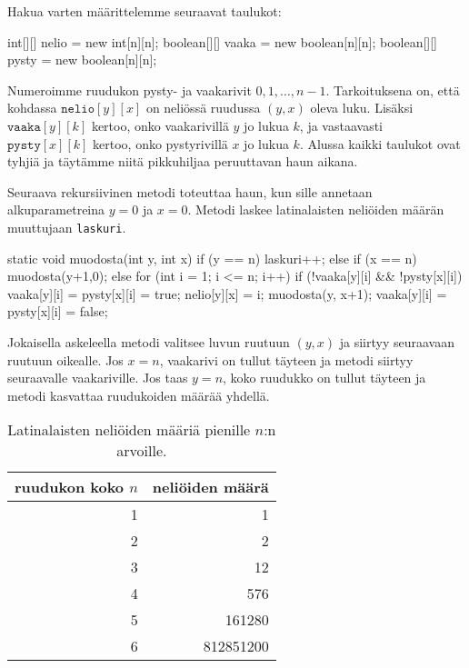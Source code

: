 Hakua varten määrittelemme seuraavat taulukot:

\begin{code}
int[][] nelio = new int[n][n];
boolean[][] vaaka = new boolean[n][n];
boolean[][] pysty = new boolean[n][n];
\end{code}

Numeroimme ruudukon pysty- ja vaakarivit $0,1,\dots,n-1$.
Tarkoituksena on, että kohdassa $\texttt{nelio}[y][x]$
on neliössä ruudussa $(y,x)$ oleva luku.
Lisäksi $\texttt{vaaka}[y][k]$ kertoo, onko vaakarivillä $y$
jo lukua $k$, ja vastaavasti $\texttt{pysty}[x][k]$ kertoo,
onko pystyrivillä $x$ jo lukua $k$.
Alussa kaikki taulukot ovat tyhjiä ja täytämme niitä
pikkuhiljaa peruuttavan haun aikana.

Seuraava rekursiivinen metodi toteuttaa haun, kun sille
annetaan alkuparametreina $y=0$ ja $x=0$.
Metodi laskee latinalaisten neliöiden määrän muuttujaan 
\texttt{laskuri}.

\begin{code}
static void muodosta(int y, int x) {
    if (y == n) laskuri++;
    else if (x == n) muodosta(y+1,0);
    else {
        for (int i = 1; i <= n; i++) {
            if (!vaaka[y][i] && !pysty[x][i]) {
                vaaka[y][i] = pysty[x][i] = true;
                nelio[y][x] = i;
                muodosta(y, x+1);
                vaaka[y][i] = pysty[x][i] = false;
            }
        }
    }
}
\end{code}

Jokaisella askeleella metodi valitsee luvun ruutuun
$(y,x)$ ja siirtyy seuraavaan ruutuun oikealle.
Jos $x=n$, vaakarivi on tullut täyteen ja metodi siirtyy
seuraavalle vaakariville.
Jos taas $y=n$, koko ruudukko on tullut täyteen ja
metodi kasvattaa ruudukoiden määrää yhdellä.

\begin{table}
\center
\begin{tabular}{rr}
ruudukon koko $n$ & neliöiden määrä \\
\hline
1 & 1 \\
2 & 2 \\
3 & 12 \\
4 & 576 \\
5 & 161280 \\
6 & 812851200 \\
\end{tabular}
\caption{Latinalaisten neliöiden määriä pienille $n$:n arvoille.}
\label{tab:latnel}
\end{table}

